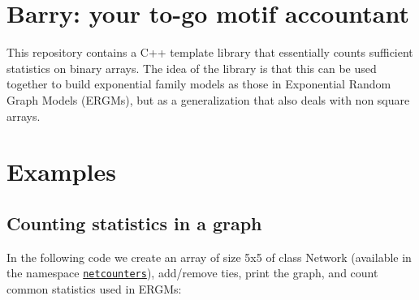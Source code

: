 \href{https://travis-ci.com/USCbiostats/barry}{\tt }

\section*{Barry\+: your to-\/go motif accountant}

This repository contains a C++ template library that essentially counts sufficient statistics on binary arrays. The idea of the library is that this can be used together to build exponential family models as those in Exponential Random Graph Models (E\+R\+G\+Ms), but as a generalization that also deals with non square arrays.

\section*{Examples}

\subsection*{Counting statistics in a graph}

In the following code we create an array of size 5x5 of class {\ttfamily Network} (available in the namespace \href{https://uscbiostats.github.io/barry/namespacebarry_1_1counters_1_1network.html}{\tt netcounters}), add/remove ties, print the graph, and count common statistics used in E\+R\+G\+Ms\+:


